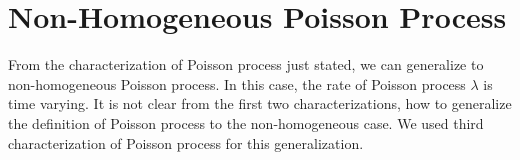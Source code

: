 \documentclass[a4paper,english,12pt]{article}
\begin{document}
%


\section{Non-Homogeneous Poisson Process}
From the characterization of Poisson process just stated, we can generalize to non-homogeneous Poisson process. In this case, the rate of Poisson process $\lambda$ is time varying. It is not clear from the first two characterizations, how to generalize the definition of Poisson process to the non-homogeneous case. We used third characterization of Poisson process for this generalization. 
\end{document}
